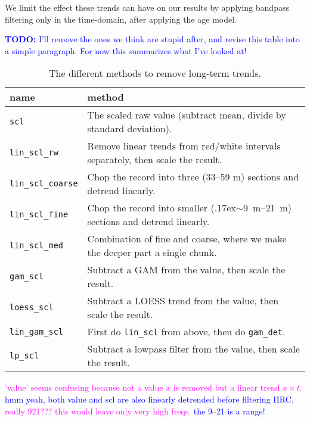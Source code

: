 \documentclass[draft]{agujournal2019}
\newcommand{\appr}{\raise.17ex\hbox{$\scriptstyle\sim$}} %
\newcommand{\rez}{\textcolor{magenta}}
\newcommand{\ijk}{\textcolor{blue}}
\begin{document}
We limit the effect these trends can have on our results by applying bandpass filtering only in the time-domain, after applying the age model.

\ijk{\textbf{TODO:} I'll remove the ones we think are stupid after, and revise this table into a simple paragraph. For now this summarizes what I've looked at!}

\begin{table}[htbp]
  \caption{\label{tab:detrend_types}
    The different methods to remove long-term trends.}
\centering
\begin{tabular}{ll}
  name & method\\
  \hline
  \texttt{scl} & The scaled raw value (subtract mean, divide by standard deviation). \\
  \texttt{lin\_scl\_rw} & Remove linear trends from red/white intervals separately, then scale the result.\\ %
  \texttt{lin\_scl\_coarse} & Chop the record into three (33--59 m) sections and detrend linearly.\\
  \texttt{lin\_scl\_fine} & Chop the record into smaller (\appr\qtyrange{9}{21}{\metre}) sections and detrend linearly.\\
  \texttt{lin\_scl\_med} & Combination of fine and coarse, where we make the deeper part a single chunk.\\
  \texttt{gam\_scl} & Subtract a \gls{GAM} from the value, then scale the result.\\
  \texttt{loess\_scl} & Subtract a LOESS trend from the value, then scale the result.\\
  \texttt{lin\_gam\_scl} & First do \texttt{lin\_scl} from above, then do \texttt{gam\_det}.\\ %
  \texttt{lp\_scl} & Subtract a lowpass filter from the value, then scale the result.\\
\end{tabular}
\rez{'value' seems confusing because not a value $x$ is removed but
a linear trend $x \times t$.} \\
\ijk{hmm yeah, both value and scl are also linearly detrended before filtering IIRC}.\\
\rez{really 921??? this would leave only very high freqs.}
\ijk{the 9--21 is a range!}
\end{table}
\end{document}
